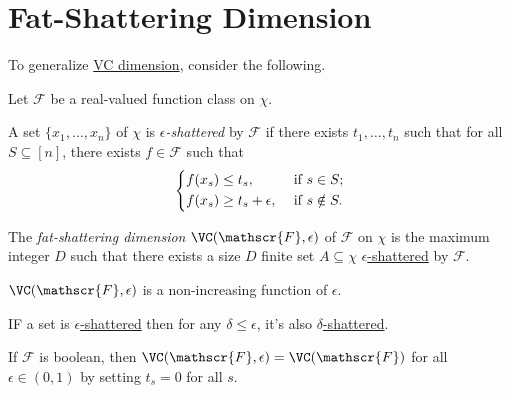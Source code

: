 \section{Fat-Shattering Dimension}
To generalize \hyperref[def:VC-dimension]{VC dimension}, consider the following.

\begin{definition*}
	Let \(\mathscr{F} \) be a real-valued function class on \(\chi \).
	\begin{definition}\label{def:eps-shattered}
		A set \(\{ x_1, \dots , x_n \} \) of \(\chi \) is \emph{\(\epsilon \)-shattered} by \(\mathscr{F} \) if there exists \(t_1, \dots , t_n\) such that for all \(S \subseteq [n]\), there exists \(f\in \mathscr{F} \) such that
		\[
			\begin{dcases}
				f(x_s) \leq t_s,             & \text{ if } s\in S ;   \\
				f(x_s) \geq t_s + \epsilon , & \text{ if } s\notin S.
			\end{dcases}
		\]
	\end{definition}

	\begin{definition}\label{def:fat-shattering-dimension}
		The \emph{fat-shattering dimension} \(\VC(\mathscr{F}, \epsilon)\) of \(\mathscr{F} \) on \(\chi \) is the maximum integer \(D\) such that there exists a size \(D\) finite set \(A \subseteq \chi \) \hyperref[def:eps-shattered]{\(\epsilon\)-shattered} by \(\mathscr{F} \).
	\end{definition}
\end{definition*}

\begin{remark}
	\(\VC(\mathscr{F} , \epsilon )\) is a non-increasing function of \(\epsilon \).
\end{remark}
\begin{explanation}
	IF a set is \hyperref[def:eps-shattered]{\(\epsilon\)-shattered} then for any \(\delta \leq \epsilon \), it's also \hyperref[def:eps-shattered]{\(\delta\)-shattered}.
\end{explanation}

\begin{note}
	If \(\mathscr{F} \) is boolean, then \(\VC(\mathscr{F} , \epsilon ) = \VC(\mathscr{F} )\) for all \(\epsilon \in (0, 1)\) by setting \(t_s = 0\) for all \(s\).
\end{note}

